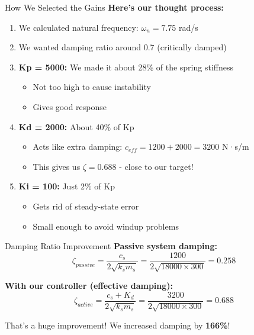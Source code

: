 \documentclass[aspectratio=169]{beamer}
\begin{document}
\begin{frame}{How We Selected the Gains}
  \textbf{Here's our thought process:}
  
  \begin{enumerate}
    \item We calculated natural frequency: $\omega_n = 7.75$ rad/s
    
    \item We wanted damping ratio around 0.7 (critically damped)
    
    \item \textbf{Kp = 5000:} We made it about 28\% of the spring stiffness
    \begin{itemize}
      \item Not too high to cause instability
      \item Gives good response
    \end{itemize}
    
    \item \textbf{Kd = 2000:} About 40\% of Kp
    \begin{itemize}
      \item Acts like extra damping: $c_{eff} = 1200 + 2000 = 3200$ N·s/m
      \item This gives us $\zeta = 0.688$ - close to our target!
    \end{itemize}
    
    \item \textbf{Ki = 100:} Just 2\% of Kp
    \begin{itemize}
      \item Gets rid of steady-state error
      \item Small enough to avoid windup problems
    \end{itemize}
  \end{enumerate}
\end{frame}

\begin{frame}{Damping Ratio Improvement}
  \textbf{Passive system damping:}
  \begin{equation}
    \zeta_{passive} = \frac{c_s}{2\sqrt{k_s m_s}} = \frac{1200}{2\sqrt{18000 \times 300}} = 0.258
  \end{equation}
  
  \vspace{0.3cm}
  
  \textbf{With our controller (effective damping):}
  \begin{equation}
    \zeta_{active} = \frac{c_s + K_d}{2\sqrt{k_s m_s}} = \frac{3200}{2\sqrt{18000 \times 300}} = 0.688
  \end{equation}
  
  \vspace{0.5cm}
  
  \begin{alertblock}{That's a huge improvement!}
    \Large We increased damping by \textbf{166\%}!
  \end{alertblock}
\end{frame}
\end{document}
